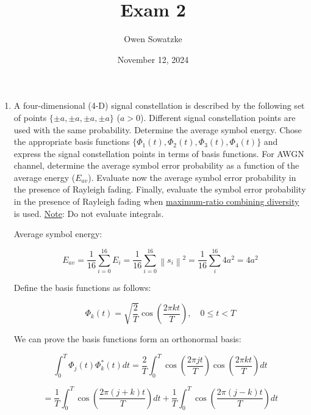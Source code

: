 \documentclass[fleqn]{article}
\title{Exam 2}
\author{Owen Sowatzke}
\date{November 12, 2024}
\newcommand{\zerodisplayskip}{
	\setlength{\abovedisplayskip}{0pt}%
	\setlength{\belowdisplayskip}{0pt}%
	\setlength{\abovedisplayshortskip}{0pt}%
	\setlength{\belowdisplayshortskip}{0pt}%
	\setlength{\mathindent}{0pt}}
\newcommand{\norm}[1]{\left \lVert #1 \right \rVert}
\begin{document}
	\offinterlineskip
	\setlength{\lineskip}{12pt}
	\zerodisplayskip
	\maketitle
	
	\begin{enumerate}
		\item A four-dimensional (4-D) signal constellation is described by the following set of points $\{\pm a, \pm a, \pm a, \pm a\}$ ($a>0$). Different signal constellation points are used with the same probability. Determine the average symbol energy. Chose the appropriate basis functions $\{\Phi_1(t), \Phi_2(t), \Phi_3(t), \Phi_4(t)\}$ and express the signal constellation points in terms of basis functions. For AWGN channel, determine the average symbol error probability as a function of the average energy ($E_{av}$). Evaluate now the average symbol error probability in the presence of Rayleigh fading. Finally, evaluate the symbol error probability in the presence of Rayleigh fading when \underline{maximum-ratio combining diversity} is used. \underline{Note}: Do not evaluate integrals.

		Average symbol energy:
		
		\begin{equation*}
			E_{av} = \frac{1}{16}\sum_{i=0}^{16}{E_i} = \frac{1}{16}\sum_{i=0}^{16}{\norm{s_i}^2} = \frac{1}{16}\sum_{i}^{16}{4a^2} = 4a^2
		\end{equation*}
		
		Define the basis functions as follows:
		
		\begin{equation*}
			\Phi_k(t) = \sqrt{\frac{2}{T}}\cos\left(\frac{2{\pi}kt}{T}\right),\quad 0 \leq t < T
		\end{equation*}
		
		We can prove the basis functions form an orthonormal basis:
		
		\begin{equation*}
			\int_{0}^{T}{\Phi_j(t)\Phi_k^*(t)dt} = \frac{2}{T}\int_{0}^{T}{\cos\left(\frac{2{\pi}jt}{T}\right)\cos\left(\frac{2{\pi}kt}{T}\right)dt}
		\end{equation*}
		
		\begin{equation*}
			= \frac{1}{T}\int_{0}^{T}{\cos\left(\frac{2{\pi}(j+k)t}{T}\right)dt} + \frac{1}{T}\int_{0}^{T}{\cos\left(\frac{2{\pi}(j-k)t}{T}\right)dt}
		\end{equation*}
		

\end{enumerate}
\end{document}
